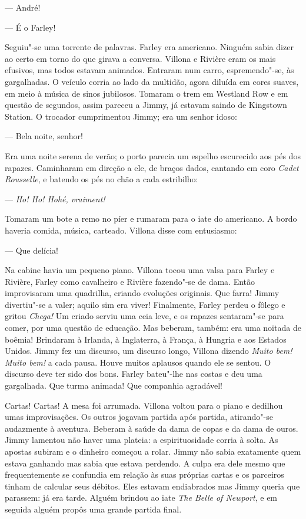 --- André!

--- É o Farley!

Seguiu"-se uma torrente de palavras.  Farley era americano.  Ninguém sabia dizer
ao certo em torno do que girava a conversa.  Villona e Rivière eram os mais
efusivos, mas todos estavam animados.  Entraram num carro, espremendo"-se, às
gargalhadas.  O veículo corria ao lado da multidão, agora diluída em cores
suaves, em meio à música de sinos jubilosos.  Tomaram o trem em Westland Row e
em questão de segundos, assim pareceu a Jimmy, já estavam saindo de Kingstown
Station.  O trocador cumprimentou Jimmy; era um senhor idoso:

--- Bela noite, senhor!

Era uma noite serena de verão; o porto parecia um espelho escurecido aos pés
dos rapazes.  Caminharam em direção a ele, de braços dados, cantando em coro
\textit{Cadet Rousselle}, e batendo os pés no chão a cada estribilho:

--- \textit{Ho! Ho! Hohé, vraiment!}

Tomaram um bote a remo no píer e rumaram para o iate do americano.  A bordo
haveria comida, música, carteado.  Villona disse com entusiasmo:

--- Que delícia!

Na cabine havia um pequeno piano.  Villona tocou uma valsa para Farley e
Rivière, Farley como cavalheiro e Rivière fazendo"-se de dama.  Então
improvisaram uma quadrilha, criando evoluções originais.  Que farra!  Jimmy
divertiu"-se a valer; aquilo sim era viver!  Finalmente, Farley perdeu o fôlego
e gritou \textit{Chega!}  Um criado serviu uma ceia leve, e os rapazes
sentaram"-se para comer, por uma questão de educação.  Mas beberam, também: era
uma noitada de boêmia!  Brindaram à Irlanda, à Inglaterra, à França, à Hungria
e aos Estados Unidos.  Jimmy fez um discurso, um discurso longo, Villona
dizendo \textit{Muito bem! Muito bem!} a cada pausa.  Houve muitos aplausos
quando ele se sentou.  O discurso deve ter sido dos bons.  Farley bateu"-lhe nas
costas e deu uma gargalhada.  Que turma animada!  Que companhia agradável!

Cartas! Cartas!  A mesa foi arrumada.  Villona voltou para o piano e dedilhou
umas improvisações.  Os outros jogavam partida após partida, atirando"-se
audazmente à aventura.  Beberam à saúde da dama de copas e da dama de ouros.
Jimmy lamentou não haver uma plateia: a espirituosidade corria à solta.  As
apostas subiram e o dinheiro começou a rolar.  Jimmy não sabia exatamente quem
estava ganhando mas sabia que estava perdendo.  A culpa era dele mesmo que
frequentemente se confundia em relação às suas próprias cartas e os parceiros
tinham de calcular seus débitos.  Eles estavam endiabrados mas Jimmy queria que
parassem: já era tarde.  Alguém brindou ao iate \textit{The Belle of
Newport}, e em seguida alguém propôs uma grande partida final.

